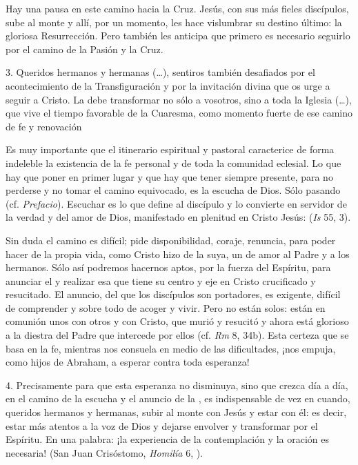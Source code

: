 \begin{body}
Hay una pausa en este camino hacia la Cruz. Jesús, con sus más fieles discípulos, sube al monte y allí, por un momento, les hace vislumbrar su destino último: la gloriosa Resurrección. Pero también les anticipa que primero es necesario seguirlo por el camino de la Pasión y la Cruz.

3. Queridos hermanos y hermanas (\ldots), sentiros también desafiados por el acontecimiento de la Transfiguración y por la invitación divina que os urge a seguir a Cristo. La  debe transformar no sólo a vosotros, sino a toda la Iglesia (\ldots), que vive el tiempo favorable de la Cuaresma, como momento fuerte de ese camino de fe y renovación  

Es muy importante que el itinerario espiritual y pastoral caracterice de forma indeleble la existencia de la fe personal y de toda la comunidad eclesial. Lo que hay que poner en primer lugar y que hay que tener siempre presente, para no perderse y no tomar el camino equivocado, es la escucha de Dios. Sólo pasando  (cf. \textit{Prefacio}). Escuchar es lo que define al discípulo y lo convierte en servidor de la verdad y del amor de Dios, manifestado en plenitud en Cristo Jesús:  (\textit{Is} 55, 3).

Sin duda el camino es difícil; pide disponibilidad, coraje, renuncia, para poder hacer de la propia vida, como Cristo hizo de la suya, un  de amor al Padre y a los hermanos. Sólo así podremos hacernos aptos, por la fuerza del Espíritu, para anunciar el  y realizar esa  que tiene su centro y eje en Cristo crucificado y resucitado. El anuncio, del que los discípulos son portadores, es exigente, difícil de comprender y sobre todo de acoger y vivir. Pero no están solos: están en comunión unos con otros y con Cristo, que murió y resucitó y ahora está glorioso a la diestra del Padre que intercede por ellos (cf. \textit{Rm} 8, 34b). Esta certeza que se basa en la fe, mientras nos consuela en medio de las dificultades, ¡nos empuja, como hijos de Abraham, a esperar contra toda esperanza!

4. Precisamente para que esta esperanza no disminuya, sino que crezca día a día, en el camino de la escucha y el anuncio de la , es indispensable de vez en cuando, queridos hermanos y hermanas, subir al monte con Jesús y estar con él: es decir, estar más atentos a la voz de Dios y dejarse envolver y transformar por el Espíritu. En una palabra: ¡la experiencia de la contemplación y la oración es necesaria!  (San Juan Crisóstomo, \textit{Homilía} 6, ).


\end{body}
